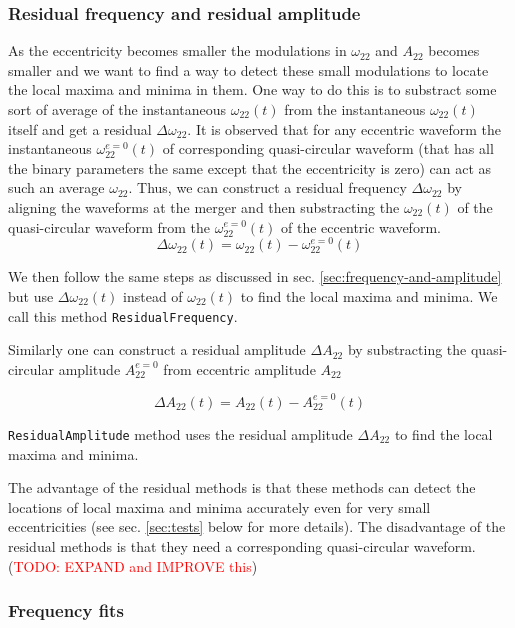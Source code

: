 \documentclass[aps,prd,amsmath,floats,floatfix, twocolumn,
superscriptaddress,nofootinbib,showpacs]{revtex4-1}
\newcommand{\red}{\textcolor{red}}
\newcommand{\TODO}[1]{\red{TODO: #1}}
\newcommand{\zeroA}{A_{22}^{e=0}}
\newcommand{\zeroOmega}{\omega_{22}^{e=0}}
\newcommand{\mResAmp}{\texttt{ResidualAmplitude}}
\newcommand{\mResFreq}{\texttt{ResidualFrequency}}
\newcommand{\resAmp}{\Delta A_{22}}
\newcommand{\resOmega}{\Delta \omega_{22}}
\begin{document}
\subsubsection{Residual frequency and residual amplitude}
\label{sec:residual-frequency-and-residual-amplitude}
As the eccentricity becomes smaller the modulations in $\omega_{22}$
and $A_{22}$ becomes smaller and we want to find a way to detect these
small modulations to locate the local maxima and minima in them. One
way to do this is to substract some sort of average of the
instantaneous $\omega_{22}(t)$ from the instantaneous $\omega_{22}(t)$
itself and get a residual $\resOmega$. It is observed that for
any eccentric waveform the instantaneous $\zeroOmega(t)$ of
corresponding quasi-circular waveform (that has all the binary
parameters the same except that the eccentricity is zero) can act as
such an average $\omega_{22}$. Thus, we can construct a residual
frequency $\resOmega$ by aligning the waveforms at the merger
and then substracting the $\omega_{22}(t)$ of the quasi-circular
waveform from the $\zeroOmega(t)$ of the eccentric waveform.
\begin{equation}
  \label{eq:residual-omega22}
  \resOmega(t) = \omega_{22}(t) - \zeroOmega(t)
\end{equation}

We then follow the same steps as discussed in
sec. \ref{sec:frequency-and-amplitude} but use $\resOmega(t)$
instead of $\omega_{22}(t)$ to find the local maxima and minima. We
call this method \mResFreq{}.

Similarly one can construct a residual amplitude $\resAmp$ by
substracting the quasi-circular amplitude $\zeroA$ from
eccentric amplitude $A_{22}$

\begin{equation}
  \label{eq:residual-amplitude}
  \resAmp(t) = A_{22}(t) - \zeroA(t)
\end{equation}

\mResAmp{} method uses the residual amplitude $\Delta
A_{22}$ to find the local maxima and minima.

The advantage of the residual methods is that these methods can detect
the locations of local maxima and minima accurately even for very
small eccentricities (see sec. \ref{sec:tests} below for more
details). The disadvantage of the residual methods is that they need a
corresponding quasi-circular waveform. (\TODO{EXPAND and IMPROVE this})

\subsubsection{Frequency fits}
\label{sec:frequenc-fits}
\end{document}
